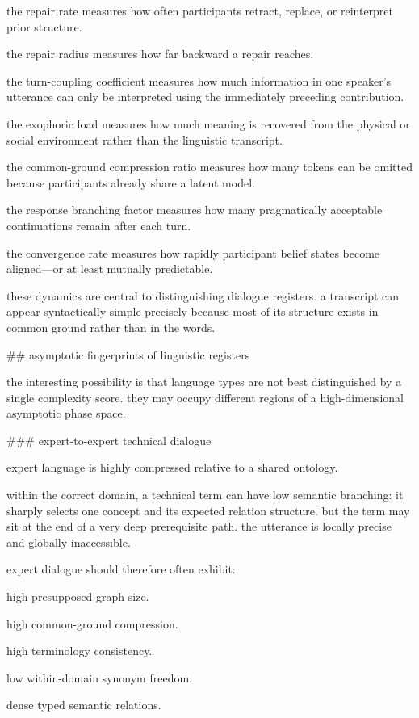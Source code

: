 the repair rate measures how often participants retract, replace, or reinterpret prior structure.

the repair radius measures how far backward a repair reaches.

the turn-coupling coefficient measures how much information in one speaker’s utterance can only be interpreted using the immediately preceding contribution.

the exophoric load measures how much meaning is recovered from the physical or social environment rather than the linguistic transcript.

the common-ground compression ratio measures how many tokens can be omitted because participants already share a latent model.

the response branching factor measures how many pragmatically acceptable continuations remain after each turn.

the convergence rate measures how rapidly participant belief states become aligned—or at least mutually predictable.

these dynamics are central to distinguishing dialogue registers. a transcript can appear syntactically simple precisely because most of its structure exists in common ground rather than in the words.

## asymptotic fingerprints of linguistic registers

the interesting possibility is that language types are not best distinguished by a single complexity score. they may occupy different regions of a high-dimensional asymptotic phase space.

### expert-to-expert technical dialogue

expert language is highly compressed relative to a shared ontology.

within the correct domain, a technical term can have low semantic branching: it sharply selects one concept and its expected relation structure. but the term may sit at the end of a very deep prerequisite path. the utterance is locally precise and globally inaccessible.

expert dialogue should therefore often exhibit:

high presupposed-graph size.

high common-ground compression.

high terminology consistency.

low within-domain synonym freedom.

dense typed semantic relations.

